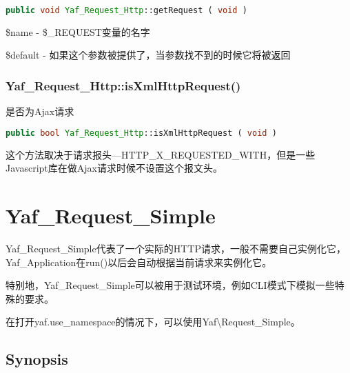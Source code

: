 \begin{lstlisting}[language=PHP]
public void Yaf_Request_Http::getRequest ( void )
\end{lstlisting}

\begin{compactitem}
\item \$name - \$\_REQUEST变量的名字
\item \$default - 如果这个参数被提供了，当参数找不到的时候它将被返回
\end{compactitem}

\subsection{Yaf\_Request\_Http::isXmlHttpRequest()}

是否为Ajax请求


\begin{lstlisting}[language=PHP]
public bool Yaf_Request_Http::isXmlHttpRequest ( void )
\end{lstlisting}

这个方法取决于请求报头—HTTP\_X\_REQUESTED\_WITH，但是一些Javascript库在做Ajax请求时候不设置这个报文头。


\chapter{Yaf\_Request\_Simple}


Yaf\_Request\_Simple代表了一个实际的HTTP请求，一般不需要自己实例化它，Yaf\_Application在run()以后会自动根据当前请求来实例化它。

特别地，Yaf\_Request\_Simple可以被用于测试环境，例如CLI模式下模拟一些特殊的要求。

在打开yaf.use\_namespace的情况下，可以使用Yaf\textbackslash Request\_Simple。

\section{Synopsis}

